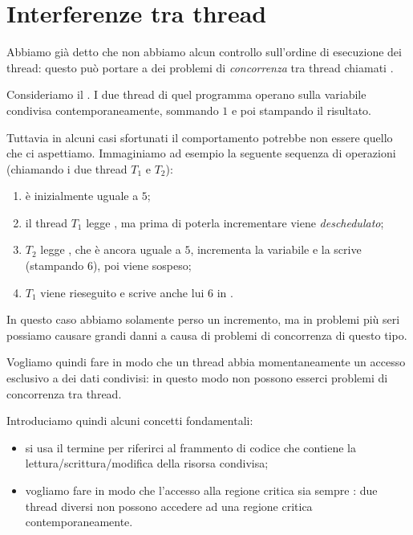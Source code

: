 \section{Interferenze tra thread}

Abbiamo già detto che non abbiamo alcun controllo sull'ordine di esecuzione dei thread: questo può portare a dei problemi di \emph{concorrenza} tra thread chiamati .

Consideriamo il . I due thread di quel programma operano sulla variabile condivisa  contemporaneamente, sommando $1$ e poi stampando il risultato.

Tuttavia in alcuni casi sfortunati il comportamento potrebbe non essere quello che ci aspettiamo. Immaginiamo ad esempio la seguente sequenza di operazioni (chiamando i due thread $T_1$ e $T_2$): \begin{enumerate}
    \item {} è inizialmente uguale a $5$; 
    \item il thread $T_1$ legge , ma prima di poterla incrementare viene \emph{deschedulato};
    \item $T_2$ legge , che è ancora uguale a $5$, incrementa la variabile e la scrive (stampando $6$), poi viene sospeso;
    \item $T_1$ viene rieseguito e scrive anche lui $6$ in .     
\end{enumerate}

In questo caso abbiamo solamente perso un incremento, ma in problemi più seri possiamo causare grandi danni a causa di problemi di concorrenza di questo tipo.

Vogliamo quindi fare in modo che un thread abbia momentaneamente un accesso esclusivo a dei dati condivisi: in questo modo non possono esserci problemi di concorrenza tra thread.

Introduciamo quindi alcuni concetti fondamentali:
\begin{itemize}
    \item si usa il termine  per riferirci al frammento di codice che contiene la lettura/scrittura/modifica della risorsa condivisa;
    \item vogliamo fare in modo che l'accesso alla regione critica sia sempre : due thread diversi non possono accedere ad una regione critica contemporaneamente. 
\end{itemize}

